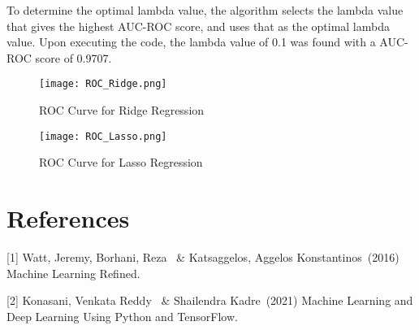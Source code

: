 \documentclass{article}
\begin{document}
To determine the optimal lambda value, the algorithm selects the lambda value that gives the highest AUC-ROC score, and uses that as the optimal lambda value. Upon executing the code, the lambda value of 0.1 was found with a AUC-ROC score of 0.9707.

\begin{figure}[!ht]
    \centering
    \texttt{[image: ROC\_Ridge.png]}
    \caption{ROC Curve for Ridge Regression}
\end{figure}

\begin{figure}[!ht]
    \centering
    \texttt{[image: ROC\_Lasso.png]}
    \caption{ROC Curve for Lasso Regression}
\end{figure}

\clearpage
\section*{References}
{
\small
[1] Watt, Jeremy, Borhani, Reza \ \& Katsaggelos, Aggelos Konstantinos\ (2016) Machine Learning Refined.

[2] Konasani, Venkata Reddy \ \& Shailendra Kadre\ (2021) Machine Learning and Deep Learning Using Python and TensorFlow.
}
\end{document}
